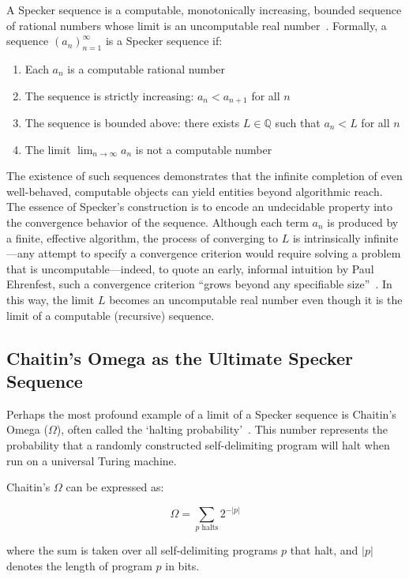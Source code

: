 \documentclass[shortAfour,sageh,times]{sagej}
\begin{document}
A Specker sequence is a computable, monotonically increasing, bounded sequence of rational numbers whose limit is an uncomputable real number~\citep{specker49,kreisel}.
Formally, a sequence $(a_n)_{n=1}^{\infty}$ is a Specker sequence if:
\begin{enumerate}
    \item Each $a_n$ is a computable rational number
    \item The sequence is strictly increasing: $a_n < a_{n+1}$ for all $n$
    \item The sequence is bounded above: there exists $L \in \mathbb{Q}$ such that $a_n < L$ for all $n$
    \item The limit $\lim_{n \to \infty} a_n$ is not a computable number
\end{enumerate}

The existence of such sequences demonstrates that the infinite completion of even well-behaved, computable objects can yield entities beyond algorithmic reach.
The essence of Specker's construction is to  encode an undecidable property into the convergence behavior of the sequence. Although each term \(a_n\) is produced by a finite, effective algorithm, the process of converging to \(L\) is intrinsically infinite---any
attempt to specify a convergence criterion would require solving a problem that is uncomputable---indeed, to quote an early, informal intuition by Paul Ehrenfest, such a convergence criterion ``grows beyond any specifiable size''~\citep{Ehrenfest_09c}.
 In this way, the limit \(L\) becomes an uncomputable real number even though it is the limit of a computable (recursive) sequence.


\subsection{Chaitin's Omega as the Ultimate Specker Sequence}

Perhaps the most profound example of a limit of a Specker sequence is Chaitin's Omega ($\Omega$), often called the `halting probability'~\citep{ch:75}.
This number represents the probability that a randomly constructed self-delimiting program will halt when run on a universal Turing machine.

Chaitin's $\Omega$ can be expressed as:

$$\Omega = \sum_{p \text{ halts}} 2^{-|p|}$$

where the sum is taken over all self-delimiting programs $p$ that halt, and $|p|$ denotes the length of program $p$ in bits.
\end{document}
